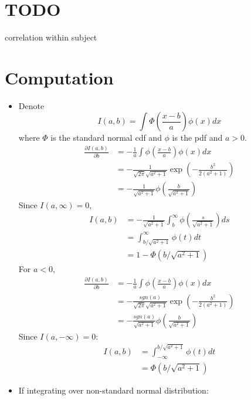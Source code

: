 \documentclass[12pt]{article}
\begin{document}
\section{TODO}

correlation within subject

\section{Computation}
\label{sec:computation}
\begin{itemize}
\item Denote
  \begin{displaymath}
    I(a,b) = \int \Phi \left( \frac{x-b}{a} \right)\phi(x) dx 
  \end{displaymath}
  where $\Phi$ is the standard normal cdf and $\phi$ is the pdf and $a > 0$.
  \begin{align*}
    \frac{\partial I(a,b)}{\partial b} & = - \frac{1}{a} \int \phi \left( \frac{x-b}{a} \right) \phi(x) dx \\
    & = - \frac{1}{\sqrt{2 \pi} \sqrt{a^2+1}} \exp \left( - \frac{b^2}{2(a^2+1)} \right)\\
    & = -\frac{1}{\sqrt{a^2+1}} \phi \left( \frac{b}{\sqrt{a^2+1}} \right)
  \end{align*}
  Since $I(a, \infty) = 0$,
  \begin{align}
    I(a,b) &= - \frac{1}{\sqrt{a^2+1}} \int_b^{\infty} \phi \left( \frac{s}{\sqrt{a^2+1}} \right) ds \nonumber \\
    &= \int_{b/\sqrt{a^2+1}}^{\infty} \phi(t) dt \nonumber\\
    \label{eq:int}
    & = 1- \Phi(b/\sqrt{a^2+1})
  \end{align}
  For $a < 0$,
  \begin{align*}
    \frac{\partial I(a,b)}{\partial b} & = - \frac{1}{a} \int \phi \left( \frac{x-b}{a} \right) \phi(x) dx \\
    & = - \frac{sgn(a)}{\sqrt{2 \pi} \sqrt{a^2+1}} \exp \left( - \frac{b^2}{2(a^2+1)} \right)\\
    & = -\frac{sgn(a)}{\sqrt{a^2+1}} \phi \left( \frac{b}{\sqrt{a^2+1}}
    \right)
  \end{align*}
  Since $I(a, -\infty) = 0$:
  \begin{align}
    I(a,b) &= \int^{b/\sqrt{a^2+1}}_{-\infty} \phi(t) dt \nonumber\\
    \label{eq:intneg}
    & = \Phi(b/\sqrt{a^2+1})
  \end{align}
\item If integrating over non-standard normal distribution:

\end{itemize}
\end{document}
